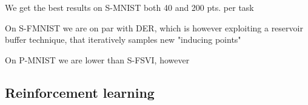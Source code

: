 \documentclass{article}
\newlength{\tblw}
\newcommand{\our}{\textsc{sfr}\xspace}
\begin{document}


We get the best results on S-MNIST both 40 and 200 pts. per task

On S-FMNIST we are on par with DER, which is however exploiting a reservoir buffer technique, that iteratively samples new "inducing points"

On P-MNIST we are lower than S-FSVI, however %




\begin{table}[t!] 
  \centering\scriptsize
  \caption{
  TODO: CL Experiments. $^*$ Methods relying only on weight regularization. 
  }
	\label{tbl:cl_table_1}
	\renewcommand{\arraystretch}{1.}
	\setlength{\tabcolsep}{2pt}
	\setlength{\tblw}{0.14\textwidth}  
	
	\newcommand{\val}[2]{%
		$#1$\textcolor{gray}{\tiny ${\pm}#2$}
	} 
	
	
\end{table}


\subsection{Reinforcement learning}



\end{document}
